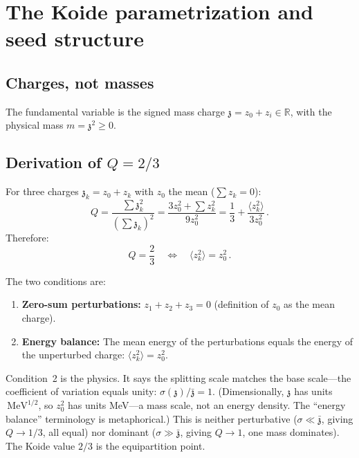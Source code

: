 \documentclass[12pt,a4paper]{article}
\newcommand{\MeV}{\,\text{MeV}}
\newcommand{\zch}{\mathfrak{z}}
\begin{document}
\section{The Koide parametrization and seed structure}

\subsection{Charges, not masses}

The fundamental variable is the signed mass charge $\zch = z_0 + z_i
\in \mathbb{R}$, with the physical mass $m = \zch^2 \geq 0$.

\subsection{Derivation of $Q = 2/3$}

For three charges $\zch_k = z_0 + z_k$ with $z_0$ the mean
($\sum z_k = 0$):
\begin{equation}
Q = \frac{\sum \zch_k^2}{(\sum \zch_k)^2}
= \frac{3z_0^2 + \sum z_k^2}{9z_0^2}
= \frac{1}{3} + \frac{\langle z_k^2\rangle}{3z_0^2}\,.
\end{equation}
Therefore:
\begin{equation}
\boxed{Q = \frac{2}{3} \quad\Longleftrightarrow\quad
\langle z_k^2\rangle = z_0^2\,.}
\end{equation}

The two conditions are:
\begin{enumerate}
\item \textbf{Zero-sum perturbations:} $z_1 + z_2 + z_3 = 0$
(definition of $z_0$ as the mean charge).
\item \textbf{Energy balance:} The mean energy of the perturbations
equals the energy of the unperturbed charge:
$\langle z_k^2\rangle = z_0^2$.
\end{enumerate}

Condition~2 is the physics. It says the splitting scale matches the
base scale---the coefficient of variation equals unity:
$\sigma(\zch)/\bar{\zch} = 1$.
(Dimensionally, $\zch$ has units $\MeV^{1/2}$, so
$z_0^2$ has units MeV---a mass scale, not an energy density.
The ``energy balance'' terminology is metaphorical.) This is neither perturbative
($\sigma \ll \bar{\zch}$, giving $Q \to 1/3$, all equal) nor
dominant ($\sigma \gg \bar{\zch}$, giving $Q \to 1$, one mass
dominates). The Koide value $2/3$ is the equipartition point.
\end{document}
